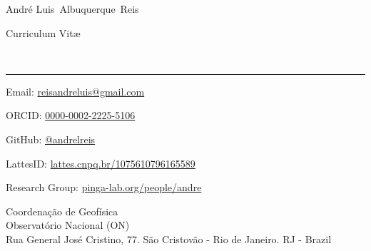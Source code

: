 \documentclass[10pt,a4paper]{article}
\makeatletter
\newcommand{\ON}{Observat\'{o}rio Nacional (ON)}
\newcommand{\COGEO}{Coordenação de Geofísica}
\newcommand{\Title}{Curriculum Vit\ae}
\newcommand{\Firstname}{Andr\'{e} Luis}
\newcommand{\Middlename}{Albuquerque}
\newcommand{\Lastname}{Reis}
\newcommand{\Fullname}{\Firstname\ \Middlename\ \Lastname}
\newcommand{\PersonalEmail}{reisandreluis@gmail.com}
\newcommand{\ResearchGroup}{pinga-lab.org/people/andre}
\newcommand{\GitHubProfile}{@andrelreis}
\newcommand{\ORCID}{0000-0002-2225-5106}
\newcommand{\LattesID}{lattes.cnpq.br/1075610796165589}
\makeatother
\begin{document}
\begin{minipage}[t]{0.5\textwidth}
  {\fontsize{20pt}{0}\selectfont\Fullname}
\end{minipage}
\begin{minipage}[t]{0.5\textwidth}
  \begin{flushright}
    \Title{}
  \end{flushright}
\end{minipage}
\\[-0.1cm]
\textcolor{black}{\rule{\textwidth}{2pt}}
\begin{minipage}[t]{0.5\textwidth}
   \footnotesize \parbox{0.04\textwidth}{\faEnvelope} Email: \href{mailto:\PersonalEmail}{\PersonalEmail}
  \\
  \footnotesize \parbox{0.04\textwidth}{\aiOrcid} ORCID: \href{https://orcid.org/\ORCID}{\ORCID}
  \\
  \footnotesize \parbox{0.04\textwidth}{\faGithub} GitHub: \href{https://github.com/andrelreis}{\GitHubProfile}
  \\
  \footnotesize \parbox{0.04\textwidth}{\aiLattes} LattesID: \href{http://lattes.cnpq.br/1075610796165589}{\LattesID}
  \\
  \footnotesize \parbox{0.04\textwidth}{\faUsers} Research Group: \href{https://www.\ResearchGroup}{\ResearchGroup}
\end{minipage}
\begin{minipage}[t]{0.5\textwidth}
  \begin{flushright}
  \COGEO
  \\
  \ON
  \\
   Rua General José Cristino, 77. São Cristovão - Rio de Janeiro. RJ - Brazil
  \end{flushright}
\end{minipage}

\vspace{0.3cm}

\end{document}
